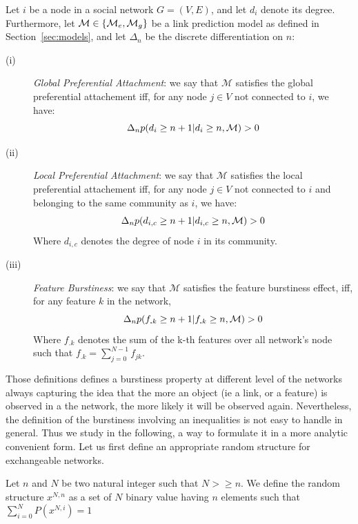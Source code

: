 \begin{definition}
Let $i$ be a node in a social network $G=(V,E)$, and let $d_i$ denote its degree. Furthermore, let $\mathcal{M} \in \{\mathcal{M}_e, \mathcal{M}_g\}$ be a link prediction model as defined in Section~\ref{sec:models}, and let $\Delta_n$ be the discrete differentiation on $n$: 
\begin{description}
\item[(i)] \emph{Global Preferential Attachment}: we say that $\mathcal{M}$ satisfies the global preferential attachement iff, for any node $j \in V$ not connected to $i$, we have:
 \begin{equation}
 \Delta_n p(d_i \geq n+1 | d_i \geq n,  \mathcal{M}) > 0
 \end{equation}
\item[(ii)] \emph{Local Preferential Attachment}: we say that $\mathcal{M}$ satisfies the local preferential attachement iff, for any node $j \in V$ not connected to $i$ and belonging to the same community as $i$, we have:
  \begin{equation}
 \Delta_n p(d_{i,c} \geq n+1 | d_{i,c} \geq n,  \mathcal{M}) > 0
 \end{equation}
  Where $d_{i,c}$ denotes the degree of node $i$ in its community.
\item[(iii)] \emph{Feature Burstiness}: we say that $\mathcal{M}$ satisfies the feature burstiness effect, iff, for any feature $k$ in the network,   
  \begin{equation}
	\Delta_n p(f_{\bm{.}k} \geq n+1 | f_{\bm{.}k} \geq n,  \mathcal{M}) > 0
  \end{equation}
   Where $f_{\bm{.}k}$ denotes the sum of the k-th features over all network's node such that $f_{\bm{.}k} = \sum_{j=0}^{N-1} f_{jk}$.
\end{description}
\label{def:burst-soc-net}
\end{definition}
%
Those definitions defines a burstiness property at different level of the networks always capturing the idea that the more an object (ie a link, or a feature) is observed in a the network, the more likely it will be observed again. Nevertheless, the definition of the burstiness involving an inequalities is not easy to handle in general. Thus we study in the following, a way to formulate it in a more analytic convenient form. Let us first define an appropriate random structure for exchangeable networks.

\begin{definition}
	Let $n$ and $N$ be two natural integer such that $N>\geq n$. We define the random structure $x^{N,n}$ as a set of $N$ binary value having $n$ elements such that $\sum_{i=0}^N P(x^{N,i}) = 1$
	\label{def:rd_struct}
\end{definition}

